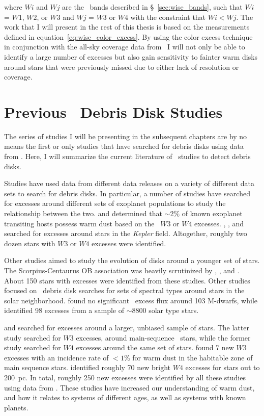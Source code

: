     
 \noindent where $Wi$ and $Wj$ are the \WS\ bands described in \S~\ref{sec:wise_bands}, such that $Wi$ = $W1$, $W2$, or $W3$ and $Wj$ = $W3$ or $W4$ with the constraint that $Wi<Wj$. The work that I will present in the rest of this thesis is based on the measurements defined in equation~\ref{eq:wise_color_excess}. By using the color excess technique in conjunction with the all-sky coverage data from \WS\, I will not only be able to identify a large number of excesses but also gain sensitivity to fainter warm disks  around stars that were previously missed due to either lack of resolution or coverage. 
    


    
\section{Previous \WS\ Debris Disk Studies}

    The series of studies I will be presenting in the subsequent chapters are by no means the first or only studies that have searched for debris disks using data from \WS. Here, I will summarize the current literature of \WS\ studies to detect debris disks.
    
    Studies have used data from different data releases on a variety of different data sets to search for debris disks. In particular, a number of studies have searched for excesses around different sets of exoplanet populations to study the relationship between the two. \citet{Krivov2011} and \citet{Morales2012} determined that $\sim$2\% of known exoplanet transiting hosts possess warm dust based on the \WS\ $W3$ or $W4$ excesses. \citet{Kennedy2012}, \citet{Ribas2012}, and \citet{Lawler2012} searched for excesses around stars in the \textit{Kepler} field. Altogether, roughly two dozen stars with $W3$ or $W4$ excesses were identified. 
    
    Other studies aimed to study the evolution of disks around a younger set of stars. The Scorpius-Centaurus OB association was heavily scrutinized by \citet{Rizzuto2012}, \citet{Luhman2012}, and \citet{Riaz2012}. About 150 stars with excesses were identified from these studies. Other studies focused on \WS\ debris disk searches for sets of spectral types around stars in the solar neighborhood. \citet{Avenhaus2012} found no significant \WS\ excess flux around 103 M-dwarfs, while \citet{Vican2014} identified 98 excesses from a sample of $\sim$8800 solar type stars. 
    
    \citet{Wu2013} and \citet{Kennedy2013} searched for excesses around a larger, unbiased sample of stars. The latter study searched for $W3$ excesses, around main-sequence \hip\ stars, while the former study searched for $W4$ excesses around the same set of stars. \citet{Kennedy2013} found 7 new $W3$ excesses with an incidence rate of $<1$\% for warm dust in the habitable zone of main sequence stars. \citet{Wu2013} identified roughly 70 new bright $W4$ excesses for stars out to 200~pc. In total, roughly 250 new excesses were identified by all these studies using data from \WS. These studies have increased our understanding of warm dust, and how it relates to systems of different ages, as well as systems with known planets. 
    
